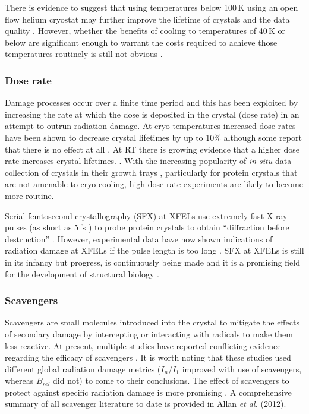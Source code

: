             There is evidence to suggest that using temperatures below 100\,K using an open flow helium cryostat may further improve the lifetime of crystals and the data quality \cite{meents2010,teng2002}.
            However, whether the benefits of cooling to temperatures of 40\,K or below are significant enough to warrant the costs required to achieve those temperatures routinely is still not obvious \cite{weik2010temperature}.

        \subsubsection{Dose rate}
        \label{subs:Dose rate}
            Damage processes occur over a finite time period and this has been exploited by increasing the rate at which the dose is deposited in the crystal (dose rate) in an attempt to outrun radiation damage.
			At cryo-temperatures increased dose rates have been shown to decrease crystal lifetimes by up to 10\% \cite{owen2006} although some report that there is no effect at all \cite{sliz2003}.
			At RT there is growing evidence that a higher dose rate increases crystal lifetimes. \cite{south2007,owen2012,owen2014}.
			With the increasing popularity of \textit{in situ} data collection of crystals in their growth trays \cite{axford2015structure,axford2012situ}, particularly for protein crystals that are not amenable to cryo-cooling, high dose rate experiments are likely to become more routine.

            Serial femtosecond crystallography (SFX) at XFELs use extremely fast X-ray pulses (as short as 5\,fs \cite{boutet2012high}) to probe protein crystals to obtain ``diffraction before destruction'' \cite{chapman2014diffraction}.
			However, experimental data have now shown indications of radiation damage at XFELs if the pulse length is too long \cite{nass2015indications}.
			SFX at XFELs is still in its infancy but progress, is continuously being made and it is a promising field for the development of structural biology \cite{garman2014,brooks2015nobel}.


        \subsubsection{Scavengers}
        \label{subs:Scavengers}
            Scavengers are small molecules introduced into the crystal to mitigate the effects of secondary damage by intercepting or interacting with radicals to make them less reactive.
			At present, multiple studies have reported conflicting evidence regarding the efficacy of scavengers \cite{barker2009room,kmetko2011can}.
			It is worth noting that these studies used different global radiation damage metrics ($I_n/I_1$ improved with use of scavengers, whereas $B_{rel}$ did not) to come to their conclusions.
			The effect of scavengers to protect against specific radiation damage is more promising \cite{southworth2007radioprotectant}.
			A comprehensive summary of all scavenger literature to date is provided in Allan \textit{et al.} (2012).

